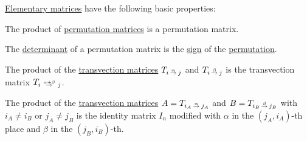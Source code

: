 \begin{proposition}\label{thm:def:elementary_matrix}
  \hyperref[def:elementary_matrix]{Elementary matrices} have the following basic properties:
  \begin{thmenum}
     The product of \hyperref[def:elementary_matrix/permutation]{permutation matrices} is a permutation matrix.

     The \hyperref[def:matrix_determinant]{determinant} of a permutation matrix is the \hyperref[def:permutation_parity]{sign} of the \hyperref[def:symmetric_group]{permutation}.

     The product of the \hyperref[def:elementary_matrix/transvection]{transvection matrices} \( T_{i \reloset \alpha \to j} \) and \( T_{i \reloset \beta \to j} \) is the transvection matrix \( T_{i \reloset {\alpha + \beta} \to j} \).

     The product of the \hyperref[def:elementary_matrix/transvection]{transvection matrices} \( A = T_{i_A \reloset \alpha \to j_A} \) and \( B = T_{i_B \reloset \beta \to j_B} \) with \( i_A \neq i_B \) or \( j_A \neq j_B \) is the identity matrix \( I_n \) modified with \( \alpha \) in the \( (j_A, i_A) \)-th place and \( \beta \) in the \( (j_B, i_B) \)-th.
  \end{thmenum}
\end{proposition}
